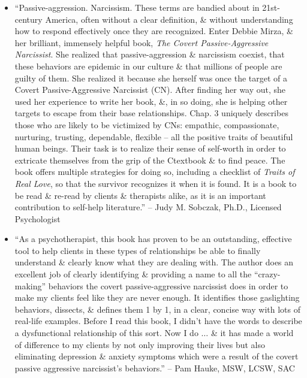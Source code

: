 \documentclass{article}
\begin{document}
\begin{enumerate}
\begin{itemize}
		\item ``Passive-aggression. Narcissism. These terms are bandied about in 21st-century America, often without a clear definition, \& without understanding how to respond effectively once they are recognized. Enter {\sc Debbie Mirza}, \& her brilliant, immensely helpful book, {\it The Covert Passive-Aggressive Narcissist}. She realized that passive-aggression \& narcissism coexist, that these behaviors are epidemic in our culture \& that millions of people are guilty of them. She realized it because she herself was once the target of a Covert Passive-Aggressive Narcissist (CN). After finding her way out, she used her experience to write her book, \&, in so doing, she is helping other targets to escape from their base relationships. Chap. 3 uniquely describes those who are likely to be victimized by CNs: empathic, compassionate, nurturing, trusting, dependable, flexible -- all the positive traits of beautiful human beings. Their task is to realize their sense of self-worth in order to extricate themselves from the grip of the Ctextbook \& to find peace. The book offers multiple strategies for doing so, including a checklist of {\it Traits of Real Love}, so that the survivor recognizes it when it is found. It is a book to be read \& re-read by clients \& therapists alike, as it is an important contribution to self-help literature.'' -- {\sc Judy M. Sobczak}, Ph.D., Licensed Psychologist
		\item ``As a psychotherapist, this book has proven to be an outstanding, effective tool to help clients in these types of relationships be able to finally understand \& clearly know what they are dealing with. The author does an excellent job of clearly identifying \& providing a name to all the ``crazy-making'' behaviors the covert passive-aggressive narcissist does in order to make my clients feel like they are never enough. It identifies those gaslighting behaviors, dissects, \& defines them 1 by 1, in a clear, concise way with lots of real-life examples. Before I read this book, I didn't have the words to describe a dysfunctional relationship of this sort. Now I do $\ldots$ \& it has made a world of difference to my clients by not only improving their lives but also eliminating depression \& anxiety symptoms which were a result of the covert passive aggressive narcissist's behaviors.'' -- {\sc Pam Hauke}, MSW, LCSW, SAC
	\end{itemize}

\end{enumerate}
\end{document}
